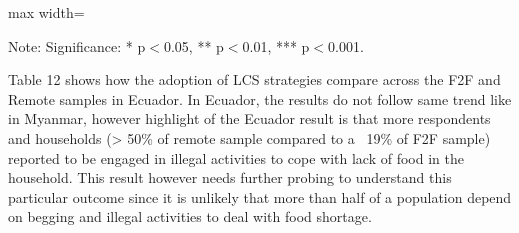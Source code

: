 \documentclass[11pt,harvard]{article}
\begin{document}
\begin{table}[htbp]
	\centering
	\begin{adjustbox}{max width=\textwidth}
		\begin{threeparttable}
			\caption{Myanmar: Each Coping Strategy Used}
			\scriptsize
			 
			\label{tab:LCS_Ind_Modality_Myanmar}
			\begin{tablenotes}
				\item Note: Significance: * p$<$0.05, ** p$<$0.01, *** p$<$0.001. 
			\end{tablenotes}
		\end{threeparttable}
	\end{adjustbox}
\end{table}


Table 12 shows how the adoption of LCS strategies compare across the F2F and Remote samples in Ecuador. In Ecuador, the results do not follow same trend like in Myanmar, however highlight of the Ecuador result is that more respondents and households (> 50\% of remote sample compared to a ~19\% of F2F sample) reported to be engaged in illegal activities to cope with lack of food in the household. This result however needs further probing to understand this particular outcome since it is unlikely that more than half of a population depend on begging and illegal activities to deal with food shortage. 
\end{document}
